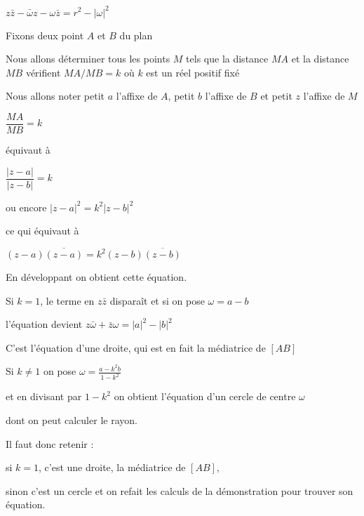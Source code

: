 $z\bar z - \bar \omega z - \omega \bar z = r^2-|\omega|^2$

\diapo


Fixons deux point $A$ et $B$ du plan

Nous allons déterminer tous les points $M$ tels que la distance
$MA$ et la distance $MB$ vérifient $MA/MB=k$
où $k$ est un réel positif fixé

\change

Nous allons noter petit $a$ l'affixe de $A$, petit $b$ l'affixe de $B$
et petit $z$ l'affixe de $M$

$\dfrac{MA}{MB}=k$

\change

équivaut à 

$\dfrac{|z-a|}{|z-b|}=k$

\change

ou encore $|z-a|^2 = k^2 |z-b|^2$

\change 

ce qui équivaut à 

$(z-a)\overline{(z-a)} = k^2 (z-b)\overline{(z-b)}$

\change

En développant on obtient cette équation.


\change

Si $k=1$, le terme en $z\bar z$ disparaît et si on pose $\omega = a-b$

l'équation devient 
$z\bar \omega  + \bar z \omega = |a|^2-|b|^2$ 


\change

C'est l'équation d'une droite, qui est en fait la médiatrice de $[AB]$

\change

Si $k\neq 1$ on pose $\omega = \frac{a-k^2b}{1-k^2}$ 

\change

et en divisant par $1-k^2$ on obtient l'équation
d'un cercle de centre $\omega$ 

\change

dont on peut calculer le rayon.

\change

Il faut donc retenir :

si $k=1$, c'est une droite, la médiatrice de $[AB]$, 

\change

sinon c'est un cercle et on refait les calculs de la démonstration pour trouver son équation.


